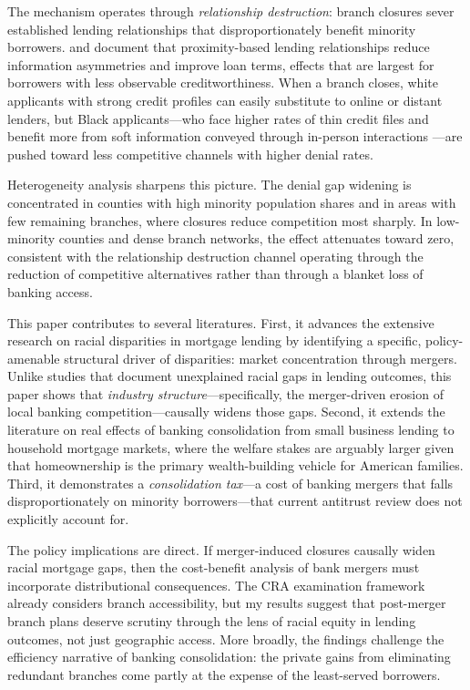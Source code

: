\documentclass[12pt]{article}
\begin{document}
The mechanism operates through \emph{relationship destruction}: branch closures sever established lending relationships that disproportionately benefit minority borrowers. \citet{degryse2005} and \citet{agarwal2010} document that proximity-based lending relationships reduce information asymmetries and improve loan terms, effects that are largest for borrowers with less observable creditworthiness. When a branch closes, white applicants with strong credit profiles can easily substitute to online or distant lenders, but Black applicants---who face higher rates of thin credit files and benefit more from soft information conveyed through in-person interactions \citep{bartlett2022}---are pushed toward less competitive channels with higher denial rates.

Heterogeneity analysis sharpens this picture. The denial gap widening is concentrated in counties with high minority population shares and in areas with few remaining branches, where closures reduce competition most sharply. In low-minority counties and dense branch networks, the effect attenuates toward zero, consistent with the relationship destruction channel operating through the reduction of competitive alternatives rather than through a blanket loss of banking access.

This paper contributes to several literatures. First, it advances the extensive research on racial disparities in mortgage lending \citep{munnell1996, ross2002, bayer2018, bhutta2020, bartlett2022} by identifying a specific, policy-amenable structural driver of disparities: market concentration through mergers. Unlike studies that document unexplained racial gaps in lending outcomes, this paper shows that \emph{industry structure}---specifically, the merger-driven erosion of local banking competition---causally widens those gaps. Second, it extends the literature on real effects of banking consolidation \citep{berger1998, garmaise2006, greenstone2020, nguyen2019} from small business lending to household mortgage markets, where the welfare stakes are arguably larger given that homeownership is the primary wealth-building vehicle for American families. Third, it demonstrates a \emph{consolidation tax}---a cost of banking mergers that falls disproportionately on minority borrowers---that current antitrust review does not explicitly account for.

The policy implications are direct. If merger-induced closures causally widen racial mortgage gaps, then the cost-benefit analysis of bank mergers must incorporate distributional consequences. The CRA examination framework already considers branch accessibility, but my results suggest that post-merger branch plans deserve scrutiny through the lens of racial equity in lending outcomes, not just geographic access. More broadly, the findings challenge the efficiency narrative of banking consolidation: the private gains from eliminating redundant branches come partly at the expense of the least-served borrowers.
\end{document}

